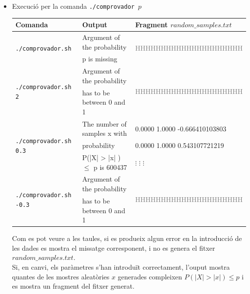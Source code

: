 \documentclass[a4paper, 11pt]{article}
\begin{document}
\begin{itemize}
    \item Execució per la comanda \texttt{./comprovador $p$}
    \begin{table}[h]
            \begin{center}
            \begin{tabular}{ l | l | l}
            \textbf{Comanda} & \textbf{Output} & \textbf{Fragment $random\_samples.txt$}\\ \hline\hline
            \multirow{2}{*}{\texttt{./comprovador.sh }} & Argument of the probability &\multirow{2}{*}{\cellcolor{GRAY}{}\textcolor{GRAY}{HHHHHHHHHHHHHHHHHHHHH} }\\ 
            &p is missing &   \cellcolor{GRAY}{}\\ \hline
            \multirow{2}{*}{\texttt{./comprovador.sh 2}} & Argument of the probability &  \multirow{2}{*}{\cellcolor{GRAY}{}\textcolor{GRAY}{HHHHHHHHHHHHHHHHHHHHH} }\\
            &has to be between 0 and 1 & \cellcolor{GRAY}{}\\ \hline
            \multirow{3}{*}{\texttt{./comprovador.sh 0.3}} & The number of samples x with & 0.0000 1.0000 -0.666410103803\\
            &probability&  0.0000 1.0000 0.543107721219\\
            &P(|X| > |x| ) $\leq$ p is 600437& \hspace{1.5em}$\vdots$ \hspace{2.5em}$\vdots$ \hspace{4.5em}$\vdots$ \\ \hline
            \multirow{2}{*}{\texttt{./comprovador.sh -0.3}} & Argument of the probability &  \multirow{2}{*}{\cellcolor{GRAY}{}\textcolor{GRAY}{HHHHHHHHHHHHHHHHHHHHH} }\\
            &has to be between 0 and 1 &  \cellcolor{GRAY}{}\\
            \end{tabular}
            \end{center}
    \end{table}
    
    Com es pot veure a les taules, si es produeix algun error en la introducció de les dades es mostra el missatge corresponent, i no es genera el fitxer $random\_samples.txt$.\\
    Si, en canvi, els paràmetres s'han introduït correctament, l'ouput mostra quantes de les mostres aleatòries $x$ generades compleixen $P(|X| > |x| ) \leq p$ i es mostra un fragment del fitxer generat.
    

\end{itemize}
\end{document}
